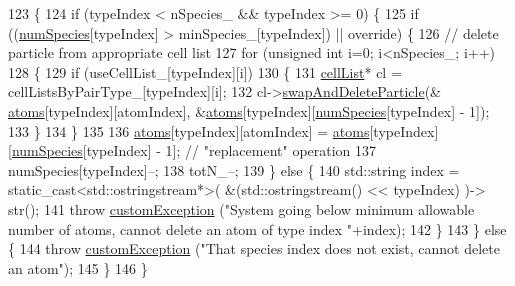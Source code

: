 \begin{DoxyCode}
123                                                                                    \{
124     \textcolor{keywordflow}{if} (typeIndex < nSpecies\_ && typeIndex >= 0) \{
125         \textcolor{keywordflow}{if} ((\hyperlink{classsim_system_a9eea865e6dc1cff377b1e79c4d9c23f0}{numSpecies}[typeIndex] > minSpecies\_[typeIndex]) || \textcolor{keyword}{override}) \{
126                 \textcolor{comment}{// delete particle from appropriate cell list}
127             \textcolor{keywordflow}{for} (\textcolor{keywordtype}{unsigned} \textcolor{keywordtype}{int} i=0; i<nSpecies\_; i++)
128             \{
129                 \textcolor{keywordflow}{if} (useCellList\_[typeIndex][i])
130                 \{
131                                 \hyperlink{classcell_list}{cellList}* cl = cellListsByPairType\_[typeIndex][i];
132                                 cl->\hyperlink{classcell_list_a31caca1e8dd05c33215ac7495d55aeea}{swapAndDeleteParticle}(&
      \hyperlink{classsim_system_a90421b19082f7fb8fc23b7264b1161e4}{atoms}[typeIndex][atomIndex], &\hyperlink{classsim_system_a90421b19082f7fb8fc23b7264b1161e4}{atoms}[typeIndex][\hyperlink{classsim_system_a9eea865e6dc1cff377b1e79c4d9c23f0}{numSpecies}[typeIndex] - 1]);
133                 \}
134             \}
135         
136             \hyperlink{classsim_system_a90421b19082f7fb8fc23b7264b1161e4}{atoms}[typeIndex][atomIndex] = \hyperlink{classsim_system_a90421b19082f7fb8fc23b7264b1161e4}{atoms}[typeIndex][\hyperlink{classsim_system_a9eea865e6dc1cff377b1e79c4d9c23f0}{numSpecies}[typeIndex] - 1]; 
         \textcolor{comment}{// "replacement" operation}
137             numSpecies[typeIndex]--;
138             totN\_--;
139         \} \textcolor{keywordflow}{else} \{
140             std::string index = \textcolor{keyword}{static\_cast<}std::ostringstream*\textcolor{keyword}{>}( &(std::ostringstream() << typeIndex) )->
      str();
141             \textcolor{keywordflow}{throw} \hyperlink{classcustom_exception}{customException} (\textcolor{stringliteral}{"System going below minimum allowable number of atoms,
       cannot delete an atom of type index "}+index);
142         \}
143     \} \textcolor{keywordflow}{else} \{
144         \textcolor{keywordflow}{throw} \hyperlink{classcustom_exception}{customException} (\textcolor{stringliteral}{"That species index does not exist, cannot delete an atom"});
145     \}
146 \}
\end{DoxyCode}
\hypertarget{classsim_system_a37b3d15faf56bf31349f5c2aaf02f858}{}
